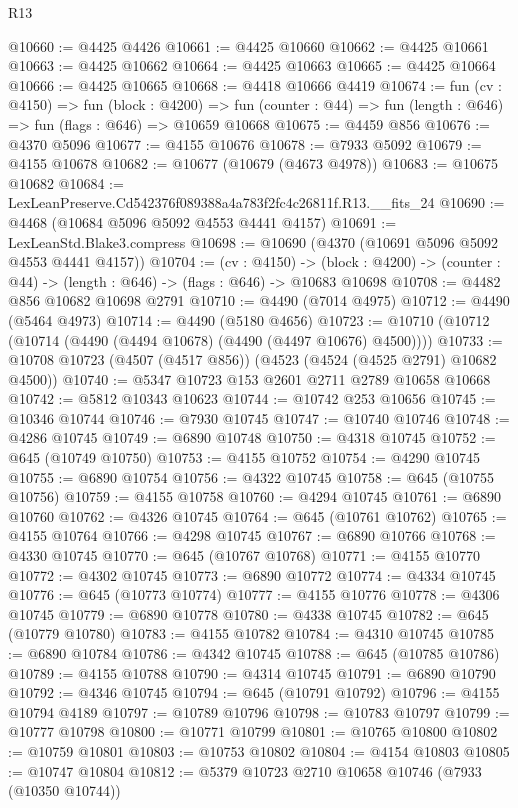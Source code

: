 \begin{lexlean}{R13}
\begin{coremodule}
@10660 := @4425 @4426
@10661 := @4425 @10660
@10662 := @4425 @10661
@10663 := @4425 @10662
@10664 := @4425 @10663
@10665 := @4425 @10664
@10666 := @4425 @10665
@10668 := @4418 @10666 @4419
@10674 := fun (cv : @4150) =>
  fun (block : @4200) =>
  fun (counter : @44) => fun (length : @646) => fun (flags : @646) => @10659 @10668
@10675 := @4459 @856
@10676 := @4370 @5096
@10677 := @4155 @10676
@10678 := @7933 @5092
@10679 := @4155 @10678
@10682 := @10677 (@10679 (@4673 @4978))
@10683 := @10675 @10682
@10684 := LexLeanPreserve.Cd542376f089388a4a783f2fc4c26811f.R13.__fits_24
@10690 := @4468 (@10684 @5096 @5092 @4553 @4441 @4157)
@10691 := LexLeanStd.Blake3.compress
@10698 := @10690 (@4370 (@10691 @5096 @5092 @4553 @4441 @4157))
@10704 := (cv : @4150) ->
  (block : @4200) -> (counter : @44) -> (length : @646) -> (flags : @646) -> @10683 @10698
@10708 := @4482 @856 @10682 @10698 @2791
@10710 := @4490 (@7014 @4975)
@10712 := @4490 (@5464 @4973)
@10714 := @4490 (@5180 @4656)
@10723 := @10710 (@10712 (@10714 (@4490 (@4494 @10678) (@4490 (@4497 @10676) @4500))))
@10733 := @10708 @10723 (@4507 (@4517 @856)) (@4523 (@4524 (@4525 @2791) @10682 @4500))
@10740 := @5347 @10723 @153 @2601 @2711 @2789 @10658 @10668
@10742 := @5812 @10343 @10623
@10744 := @10742 @253 @10656
@10745 := @10346 @10744
@10746 := @7930 @10745
@10747 := @10740 @10746
@10748 := @4286 @10745
@10749 := @6890 @10748
@10750 := @4318 @10745
@10752 := @645 (@10749 @10750)
@10753 := @4155 @10752
@10754 := @4290 @10745
@10755 := @6890 @10754
@10756 := @4322 @10745
@10758 := @645 (@10755 @10756)
@10759 := @4155 @10758
@10760 := @4294 @10745
@10761 := @6890 @10760
@10762 := @4326 @10745
@10764 := @645 (@10761 @10762)
@10765 := @4155 @10764
@10766 := @4298 @10745
@10767 := @6890 @10766
@10768 := @4330 @10745
@10770 := @645 (@10767 @10768)
@10771 := @4155 @10770
@10772 := @4302 @10745
@10773 := @6890 @10772
@10774 := @4334 @10745
@10776 := @645 (@10773 @10774)
@10777 := @4155 @10776
@10778 := @4306 @10745
@10779 := @6890 @10778
@10780 := @4338 @10745
@10782 := @645 (@10779 @10780)
@10783 := @4155 @10782
@10784 := @4310 @10745
@10785 := @6890 @10784
@10786 := @4342 @10745
@10788 := @645 (@10785 @10786)
@10789 := @4155 @10788
@10790 := @4314 @10745
@10791 := @6890 @10790
@10792 := @4346 @10745
@10794 := @645 (@10791 @10792)
@10796 := @4155 @10794 @4189
@10797 := @10789 @10796
@10798 := @10783 @10797
@10799 := @10777 @10798
@10800 := @10771 @10799
@10801 := @10765 @10800
@10802 := @10759 @10801
@10803 := @10753 @10802
@10804 := @4154 @10803
@10805 := @10747 @10804
@10812 := @5379 @10723 @2710 @10658 @10746 (@7933 (@10350 @10744))

\end{coremodule}
\end{lexlean}
